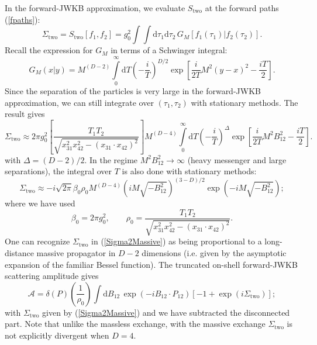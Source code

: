 In the forward-JWKB approximation, we evaluate $S_{\text{two}}$ at the forward paths (\ref{fpaths}):
\begin{equation}
	\Sigma_{\text{two}} = S_{\text{two}}[f_{1}, f_{2}] = g_{0}^{2} \int \int \mathrm{d}\tau_{1} \mathrm{d}\tau_{2} \, G_{M}[f_{1}(\tau_{1}) | f_{2}(\tau_{2})].
\end{equation}
Recall the expression for $G_{M}$ in terms of a Schwinger integral:
\begin{equation}
	G_{M}(x|y) = M^{(D-2)} \int\limits_{0}^{\infty} \mathrm{d}T \left( - \frac{i}{T} \right)^{D/2} \exp{\left[ \frac{i}{2 T} M^{2}(y - x)^{2} - \frac{i T}{2} \right]}.
\end{equation}
Since the separation of the particles is very large in the forward-JWKB approximation, we can still integrate over $(\tau_{1}, \tau_{2})$ with stationary methods. The result gives
\begin{equation}
	\Sigma_{\text{two}} \approx 2 \pi g_{0}^{2} \left[ \frac{T_{1} T_{2}}{\sqrt{x_{31}^{2} x_{42}^{2} - (x_{31} \cdot x_{42})^{2}}} \right] M^{(D - 4)} \int\limits_{0}^{\infty} \mathrm{d}T \left( - \frac{i}{T} \right)^{\Delta} \exp{\left[ \frac{i}{2 T} M^{2}B_{12}^{2} - \frac{i T}{2} \right]}.
\end{equation}
with $\Delta = (D - 2) / 2$. In the regime $M^{2} B_{12}^{2} \rightarrow \infty$ (heavy messenger and large separations), the integral over $T$ is also done with stationary methods:
\begin{equation}
	\Sigma_{\text{two}} \approx -i \sqrt{2 \pi} \beta_{0} \rho_{0} M^{(D - 4)} \left( i M \sqrt{-B_{12}^{2}} \right)^{(3 - D)/2} \exp{\left( -i M \sqrt{-B_{12}^{2}}\right)};
	\label{Sigma2Massive}
\end{equation}
where we have used
\begin{equation}
	\beta_{0} = 2 \pi g_{0}^{2}, \qquad \rho_{0} = \frac{T_{1} T_{2}}{\sqrt{x_{31}^{2} x_{42}^{2} - (x_{31} \cdot x_{42})^{2}}}.
\end{equation}
One can recognize $\Sigma_{\text{two}}$ in (\ref{Sigma2Massive}) as being proportional to a long-distance massive propagator in $D-2$ dimensions (i.e. given by the asymptotic expansion of the familiar Bessel function). The truncated on-shell forward-JWKB scattering amplitude gives
\begin{equation}
	\mathcal{A} = \delta(P) \left( \frac{1}{\rho_{0}} \right) \int \mathrm{d}B_{1 2} \, \exp{\left( - i B_{1 2} \cdot P_{1 2} \right)} \left[-1 + \exp{\left(i \Sigma_{\text{two}}\right)} \right];
	\label{DAvarphi}
\end{equation}
with $\Sigma_{\text{two}}$ given by (\ref{Sigma2Massive}) and we have subtracted the disconnected part. Note that unlike the massless exchange, with the massive exchange $\Sigma_{\text{two}}$ is not explicitly divergent when $D = 4$.
